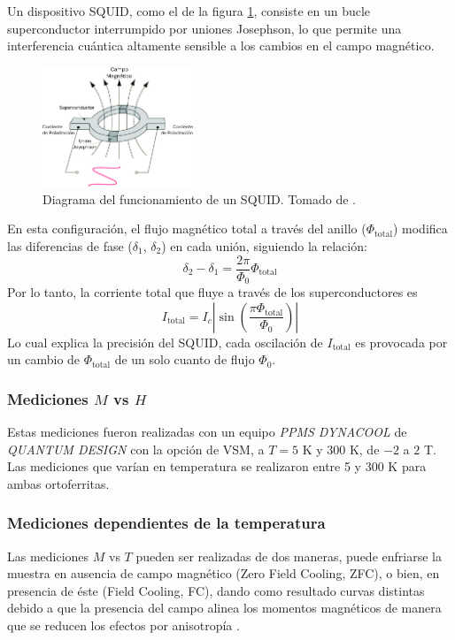 \documentclass[../main.tex]{subfiles}
\begin{document}
Un dispositivo SQUID, como el de la figura \ref{fig:squiddiag}, consiste en un bucle superconductor interrumpido por uniones Josephson, lo que permite una interferencia cuántica altamente sensible a los cambios en el campo magnético.

\begin{figure}[H]
    \centering
    \includegraphics[width=0.4\textwidth]{fig/squiddiag.png}
    \caption{Diagrama del funcionamiento de un SQUID. Tomado de \cite{Marcon2012}.}
    \label{fig:squiddiag}
\end{figure}
En esta configuración, el flujo magnético total a través del anillo ($\Phi_\text{total}$) modifica las diferencias de fase ($\delta_1$, $\delta_2$) en cada unión, siguiendo la relación:
\begin{equation}
    \delta_2-\delta_1=\dfrac{2\pi}{\Phi_0}\Phi_\text{total}
    \label{eq:flujoSQUID}
\end{equation}
Por lo tanto, la corriente total que fluye a través de los superconductores es
\begin{equation}
    I_\text{total}=I_c\left|\sin\left(\dfrac{\pi\Phi_\text{total}}{\Phi_0}\right)\right|
    \label{eq:corrienteSQUID}
\end{equation}
Lo cual explica la precisión del SQUID, cada oscilación de $I_\text{total}$ es provocada por un cambio de $\Phi_\text{total}$ de un solo cuanto de flujo $\Phi_0$.
\subsubsection{Mediciones \texorpdfstring{$M$}{M} vs \texorpdfstring{$H$}{H}}
Estas mediciones fueron realizadas con un equipo \textit{PPMS DYNACOOL} de \textit{QUANTUM DESIGN} con la opción de VSM, a $T=5$ K y $300$ K, de $-2$ a $2$ T.
Las mediciones que varían en temperatura se realizaron entre 5 y 300 K para ambas ortoferritas.
\subsubsection{Mediciones dependientes de la temperatura}
Las mediciones $M$ vs $T$ pueden ser realizadas de dos maneras, puede enfriarse la muestra en ausencia de campo magnético (Zero Field Cooling, ZFC), o bien, en presencia de éste (Field Cooling, FC), dando como resultado curvas distintas debido a que la presencia del campo alinea los momentos magnéticos de manera que se reducen los efectos por anisotropía \cite{Ali2014}.
\end{document}
